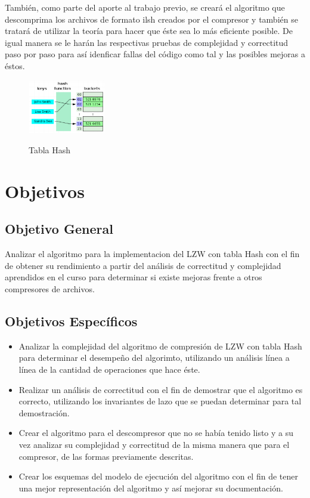 \documentclass[letterpaper]{article}
\begin{document}
También, como parte del aporte al trabajo previo, se creará el algoritmo que descomprima los archivos de formato ilsh creados por el compresor y también se tratará de utilizar la teoría para hacer que éste sea lo más eficiente posible. De igual manera se le harán las respectivas pruebas de complejidad y correctitud paso por paso para así idenficar fallas del código como tal y las posibles mejoras a éstos.\\

\begin{figure}[h!]
	\centering
	\includegraphics[width=0.3\textwidth]{Hash.png}
	\label{fig2}
	\caption{Tabla Hash}
\end{figure}

\section{Objetivos}
\subsection{Objetivo General}

Analizar el algoritmo para la implementacion del LZW con tabla Hash con el fin de obtener su rendimiento a partir del análisis de correctitud y complejidad aprendidos en el curso para determinar si existe mejoras frente a otros compresores de archivos.

\subsection{Objetivos Específicos}

\begin{itemize}

\item Analizar la complejidad del algoritmo de compresión de LZW con tabla Hash para determinar el desempeño del algorimto, utilizando un análisis línea a línea de la cantidad de operaciones que hace éste.
\item Realizar un análisis de correctitud con el fin de demostrar que el algoritmo es correcto, utilizando los invariantes de lazo que se puedan determinar para tal demostración.
\item Crear el algoritmo para el descompresor que no se había tenido listo y a su vez analizar su complejidad y correctitud de la misma manera que para el compresor, de las formas previamente descritas.
\item Crear los esquemas del modelo de ejecución del algoritmo con el fin de tener una mejor representación del algoritmo y así mejorar su documentación.\\

\end{itemize}
\end{document}
